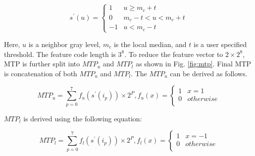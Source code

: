 \begin{equation}
	s^{\prime}(u)=\left\{\begin{matrix}
		1  & u \geq m_{c}+t       \\
		0  & m_{c}-t < u <m_{c}+t \\
		-1 & u < m_{c}-t
	\end{matrix}\right.
\end{equation}

Here, $u$ is a neighbor gray level, $m_{c}$ is the local median, and $t$ is a
user specified threshold. The feature code length is $3^{8}$. To reduce the
feature vector to $2 \times 2 ^{8}$, MTP is further split into $MTP_{u}$ and
$MTP_{l}$ as shown in Fig. \ref{fig:mtp}. Final MTP is concatenation of both
$MTP_{u}$ and $MTP_{l}$. The $MTP_{u}$ can be derived as follows.

\begin{equation}
	MTP_{u}=\sum_{p=0}^{7}f_{u}(s^{\prime}(i_{p})) \times 2^{P},
	f_{u}(x)=\left\{\begin{matrix}
		1 & x =1      \\
		0 & otherwise \\
	\end{matrix}\right.
\end{equation}

$MTP_{l}$ is derived using the following equation:

\begin{equation}
	MTP_{l}=\sum_{p=0}^{7}f_{l}(s^{\prime}(i_{p})) \times 2^{P},
	f_{l}(x)=\left\{\begin{matrix}
		1 & x=-1      \\
		0 & otherwise \\
	\end{matrix}\right.
\end{equation}

